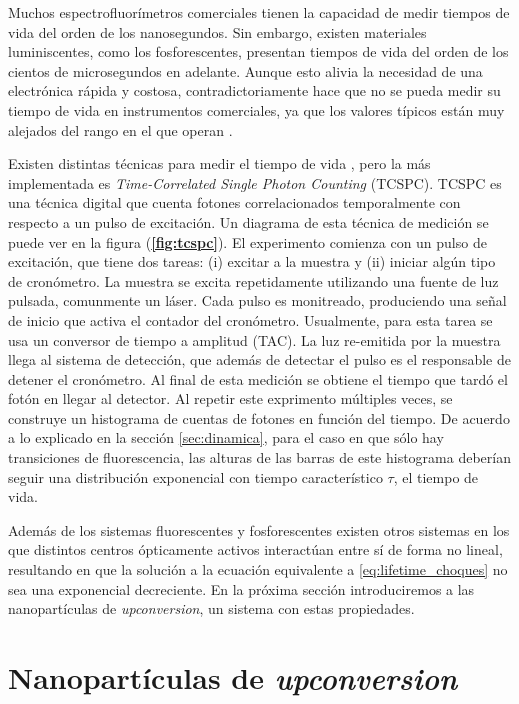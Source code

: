 Muchos espectrofluorímetros comerciales tienen la capacidad de medir tiempos de vida del orden de los nanosegundos. 
Sin embargo, existen materiales luminiscentes, como los fosforescentes, presentan tiempos de vida del orden de los cientos de microsegundos en adelante.
Aunque esto alivia la necesidad de una electrónica rápida y costosa, contradictoriamente hace que no se pueda medir su tiempo de vida en instrumentos comerciales, ya que los valores típicos están muy alejados del rango en el que operan \cite{bujjamer2020}.

Existen distintas técnicas para medir el tiempo de vida \cite{becker_fluorescence_2012}, pero la más implementada es \textit{Time-Correlated Single Photon Counting} (TCSPC).
TCSPC es una técnica digital que cuenta fotones correlacionados temporalmente con respecto a un pulso de excitación.
Un diagrama de esta técnica de medición se puede ver en la figura (\textbf{\ref{fig:tcspc}}).
El experimento comienza con un pulso de excitación, que tiene dos tareas: (i) excitar a la muestra y (ii) iniciar algún tipo de cronómetro.
La muestra se excita repetidamente utilizando una fuente de luz pulsada, comunmente un láser.
Cada pulso es monitreado, produciendo una señal de inicio que activa el contador del cronómetro.
Usualmente, para esta tarea se usa un conversor de tiempo a amplitud (TAC).
La luz re-emitida por la muestra llega al sistema de detección, que además de detectar el pulso es el responsable de detener el cronómetro.
Al final de esta medición se obtiene el tiempo que tardó el fotón en llegar al detector.
Al repetir este exprimento múltiples veces, se construye un histograma de cuentas de fotones en función del tiempo.
De acuerdo a lo explicado en la sección \ref{sec:dinamica}, para el caso en que sólo hay transiciones de fluorescencia, las alturas de las barras de este histograma deberían seguir una distribución exponencial con tiempo característico $\tau$, el tiempo de vida.

Además de los sistemas fluorescentes y fosforescentes existen otros sistemas en los que distintos centros ópticamente activos interactúan entre sí de forma no lineal, resultando en que la solución a la ecuación equivalente a \ref{eq:lifetime_choques} no sea una exponencial decreciente.
En la próxima sección introduciremos a las nanopartículas de \textit{upconversion}, un sistema con estas propiedades.


\section{Nanopartículas de \textit{upconversion}} \label{sec:intro_ucnp}

